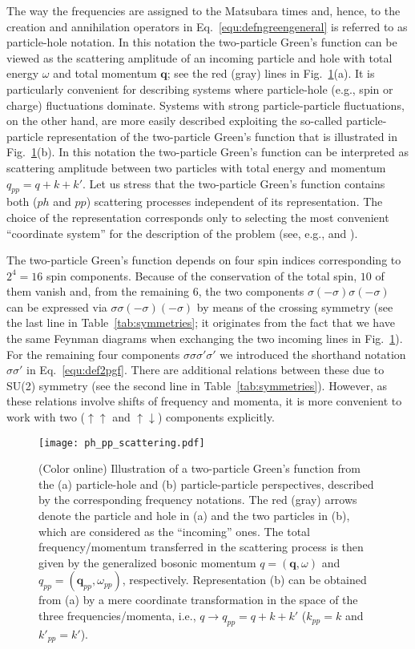\documentclass[rmp,aps,reprint,amsmath,amssymb,superscriptaddress,showpacs,nofootinbib]{revtex4-1}
\begin{document}
The way the frequencies are assigned to the Matsubara times and, hence, to the creation and annihilation operators in Eq.~\eqref{equ:defngreengeneral} is referred to as particle-hole notation. In this notation the two-particle Green's function can be viewed as the scattering amplitude of an incoming particle and  hole with  total energy $\omega$ and total momentum $\mathbf{q}$; see the red (gray) lines in Fig.~\ref{fig:ph_pp_scattering}(a). It is particularly convenient for describing systems where particle-hole (e.g., spin or charge) fluctuations dominate. Systems with strong particle-particle fluctuations, on the other hand, are more easily described exploiting the so-called particle-particle representation of the two-particle Green's function that is illustrated in Fig.~\ref{fig:ph_pp_scattering}(b). In this notation the two-particle Green's function can be interpreted as scattering amplitude between two particles with total energy and momentum $q_{pp}=q+k+k'$. Let us stress that the two-particle Green's function contains both ($ph$ and $pp$) scattering processes independent of its representation. The choice of the representation corresponds only to selecting the most convenient ``coordinate system'' for the description of the problem (see, e.g.,  and ).

The two-particle Green's function depends on four spin indices corresponding to $2^4=16$ spin components. Because of the conservation of the total spin, $10$ of them vanish and, from the remaining $6$, the two components $\sigma(-\sigma)\sigma(-\sigma)$ can be expressed via $\sigma\sigma(-\sigma)(-\sigma)$ by means of the crossing symmetry (see the last line in Table~\ref{tab:symmetries}; it originates from the fact that we have the same Feynman diagrams when exchanging the two incoming lines  in Fig.~\ref{fig:ph_pp_scattering}). For the remaining four components $\sigma\sigma\sigma'\sigma'$ we introduced the shorthand notation $\sigma\sigma'$ in Eq.~\eqref{equ:def2pgf}. There are additional relations between these due to  SU(2) symmetry (see the second line in Table~\ref{tab:symmetries}). However, as these relations involve shifts of frequency and momenta, it is more convenient to work with two ($\uparrow\uparrow$ and $\uparrow\downarrow$) components explicitly.

\begin{figure}
  \centering
  \texttt{[image: ph\_pp\_scattering.pdf]}
    \caption{(Color online) Illustration of a two-particle Green's function from the (a) particle-hole and (b) particle-particle perspectives, described by the corresponding frequency notations. The red (gray) arrows denote the  particle and hole in (a) and the two  particles  in  (b), which are considered as the ``incoming'' ones. The total frequency/momentum transferred in the scattering process is then given by the generalized bosonic momentum $q=(\mathbf{q},\omega)$ and $q_{pp}=(\mathbf{q}_{pp},\omega_{pp})$, respectively. Representation (b)  can be obtained from (a) by a mere coordinate transformation in the space of the three frequencies/momenta, i.e., $q\rightarrow q_{pp}= q+k+k'$ ($k_{pp}=k$ and $k'_{pp}=k'$). }
  \label{fig:ph_pp_scattering}
\end{figure}
\end{document}
